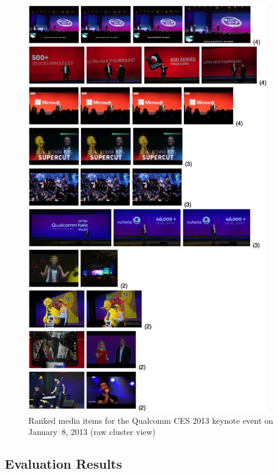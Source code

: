 \begin{figure}[!ht]
  \centering
  \includegraphics[width=0.95\textwidth,height=0.9\textheight,keepaspectratio]{qualcomm.png}
  \caption[Ranked media items for the Qualcomm CES 2013 keynote event]
  {Ranked media items for the Qualcomm CES 2013 keynote event
  on January~8, 2013 (raw cluster view)}
  \label{fig:qualcomm}
\end{figure}

\subsection{Evaluation Results}

